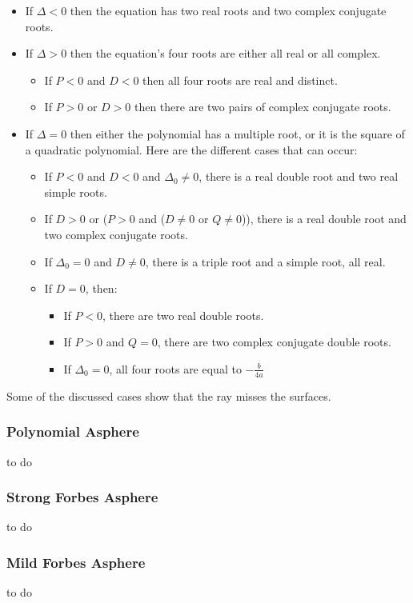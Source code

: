 \documentclass[12pt,a4paper,twoside,openright,BCOR10mm,headsepline,titlepage,abstracton,chapterprefix,final]{scrreprt}
\begin{document}
\begin{itemize}
\item If $\Delta < 0$  then the equation has two real roots and two complex conjugate roots.
\item If $\Delta > 0$  then the equation's four roots are either all real or all complex.
\begin{itemize}
\item If $P < 0$ and $D < 0$ then all four roots are real and distinct.
\item If $P > 0$ or $D > 0$ then there are two pairs of complex conjugate roots.
\end{itemize}
\item If $\Delta = 0$  then either the polynomial has a multiple root, 
  or it is the square of a quadratic polynomial. Here are the different cases that can occur:
  \begin{itemize}
\item If $P < 0$ and $D < 0$ and $\Delta_0\ne0$, there is a real double root and two real simple roots.
\item If $D > 0$ or ($P > 0$ and ($D \ne 0$ or $Q \ne 0$)), there is a real double root and two complex conjugate roots.
\item If $\Delta_0 = 0$ and $D \ne 0$, there is a triple root and a simple root, all real.
\item If $D = 0$, then:
  \begin{itemize}
\item If $P < 0$, there are two real double roots.
\item If $P > 0$ and $Q = 0$, there are two complex conjugate double roots.
\item If $ \Delta_0  = 0$, all four roots are equal to $-\frac{b}{4a}$
  \end{itemize}
  \end{itemize}
\end{itemize}
Some of the discussed cases show that the ray misses the surfaces.

\subsubsection{Polynomial Asphere}
to do
\subsubsection{Strong Forbes Asphere}
to do
\subsubsection{Mild Forbes Asphere}
to do
\end{document}
